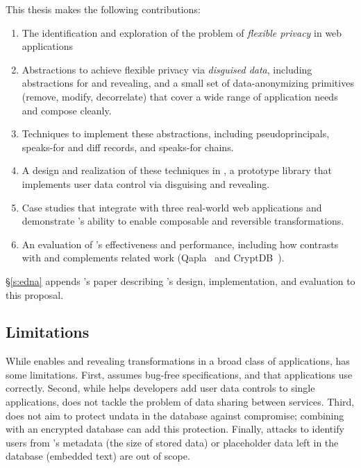 \label{sec:intro:contrib}
%
This thesis makes the following contributions: 
\begin{enumerate}[nosep]
    \item The identification and exploration of the problem of \emph{flexible privacy} in
        web applications
    \item Abstractions to achieve flexible privacy via \emph{disguised data},
        including abstractions for \xxing and revealing, and a small set of
        data-anonymizing primitives (remove, modify, decorrelate) that cover a
        wide range of application needs and compose cleanly.

    \item Techniques to implement these abstractions, including
    pseudoprincipals, speaks-for and diff
    records, and speaks-for chains.

    \item A design and realization of these techniques in \sys, a prototype
        library that implements user data control via disguising and revealing.

    \item Case studies that integrate \sys with three real-world web
    applications and demonstrate \sys's ability to enable composable and
    reversible transformations.

    \item An evaluation of \sys's effectiveness and performance, including how
    \sys contrasts with and complements related work (Qapla~\cite{qapla} and
    CryptDB~\cite{cryptdb}).  
\end{enumerate}
%
\S\ref{s:edna} appends \sys's paper describing \sys's design, implementation,
and evaluation to this proposal.

\subsection{Limitations}
%
While \sys enables \xxing and revealing transformations in a broad class of
applications, \sys has some limitations.
%
First, \sys assumes bug-free \xx specifications, and that applications use \sys
correctly.
%
Second, while \sys helps developers add user data controls to single applications,
\sys does not tackle the problem of data sharing between services.
%
Third, \sys does not aim to protect un\xxed data in the database against compromise;
combining \sys with an encrypted database can add this protection.
%
Finally, attacks to identify users from \sys's metadata (\eg the size of
stored \xxed data) or placeholder data left in the database (\eg embedded text)
are out of scope.
%

